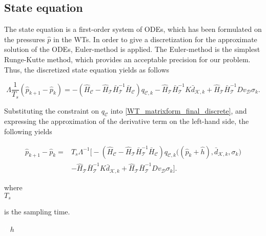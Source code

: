  \subsection{State equation}
\label{state_eq_identification} 

The state equation is a first-order system of ODEs, which has been formulated on the pressures $\hat{p}$ in the WTs. In order to give a discretization for the approximate solution of the ODEs, Euler-method is applied. The Euler-method is the simplest Runge-Kutte method, which provides an acceptable precision for our problem\cite{chicone2006ordinary}. Thus, the discretized state equation yields as follows

\begin{equation}
  \label{WT_matrixform_final_discrete}
\Lambda \frac{1}{T_s} (\hat{p}_{k+1} - \hat{p}_k)  = - (\hat{H}_{\mathcal{C}} - \hat{H}_{\mathcal{T}} \bar{H}^{-1}_{\mathcal{T}}\bar{H}_{\mathcal{C}})  q_{\mathcal{C},k} - \hat{H}_{\mathcal{T}} \bar{H}^{-1}_{\mathcal{T}} K \bar{d}_{\mathcal{K},k} + \hat{H}_{\mathcal{T}} \bar{H}^{-1}_{\mathcal{T}} D v_{\mathcal{D}} \sigma_k.
\end{equation}

Substituting the constraint on $q_{\mathcal{C}}$ into \eqref{WT_matrixform_final_discrete}, and expressing the approximation of the derivative term on the left-hand side, the following yields

\vspace{-4mm}
\begin{align}
\label{WT_matrixform_final_discrete1}
\nonumber  \hat{p}_{k+1} - \hat{p}_k  =& T_s \Lambda^{-1} \big[- (\hat{H}_{\mathcal{C}} - \hat{H}_{\mathcal{T}} \bar{H}^{-1}_{\mathcal{T}}\bar{H}_{\mathcal{C}})  q_{\mathcal{C},k}\big ((\hat{p}_k + \hat{h}),\bar{d}_{\mathcal{K},k}, \sigma_k \big) \\ & - \hat{H}_{\mathcal{T}} \bar{H}^{-1}_{\mathcal{T}} K \bar{d}_{\mathcal{K},k} + \hat{H}_{\mathcal{T}} \bar{H}^{-1}_{\mathcal{T}} D v_{\mathcal{D}} \sigma_k \big].
\end{align}
\vspace{-4mm}

\begin{minipage}[t]{0.20\textwidth}
where\\
\hspace*{8mm} $T_s$
\end{minipage}
\begin{minipage}[t]{0.68\textwidth}
\vspace*{2mm}
 is the sampling time.
\end{minipage}
\begin{minipage}[t]{0.10\textwidth}
\vspace*{2mm}
\textcolor{White}{te}$\unit{h}$
\end{minipage} 

